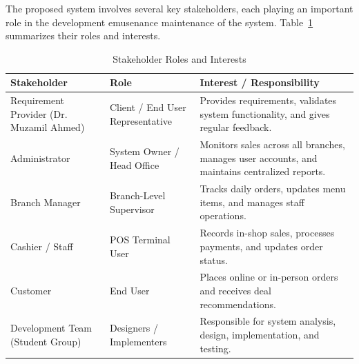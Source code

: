 \documentclass{article}
\begin{document}
The proposed system involves several key stakeholders, each playing an important role in the development emusenance maintenance of the system. 
Table~\ref{tab:stakeholders} summarizes their roles and interests.
\begin{table}[!ht]
\centering
\caption{Stakeholder Roles and Interests}
\label{tab:stakeholders}
\begin{tabularx}{\textwidth}{|p{3.8cm}|p{3.3cm}|X|}
\hline
\textbf{Stakeholder} & \textbf{Role} & \textbf{Interest / Responsibility} \\ \hline
Requirement Provider (Dr. Muzamil Ahmed) & Client / End User Representative & Provides requirements, validates system functionality, and gives regular feedback. \\ \hline
Administrator & System Owner / Head Office & Monitors sales across all branches, manages user accounts, and maintains centralized reports. \\ \hline
Branch Manager & Branch-Level Supervisor & Tracks daily orders, updates menu items, and manages staff operations. \\ \hline
Cashier / Staff & POS Terminal User & Records in-shop sales, processes payments, and updates order status. \\ \hline
Customer & End User & Places online or in-person orders and receives deal recommendations. \\ \hline
Development Team (Student Group) & Designers / Implementers & Responsible for system analysis, design, implementation, and testing. \\ \hline
\end{tabularx}
\end{table}
\end{document}
